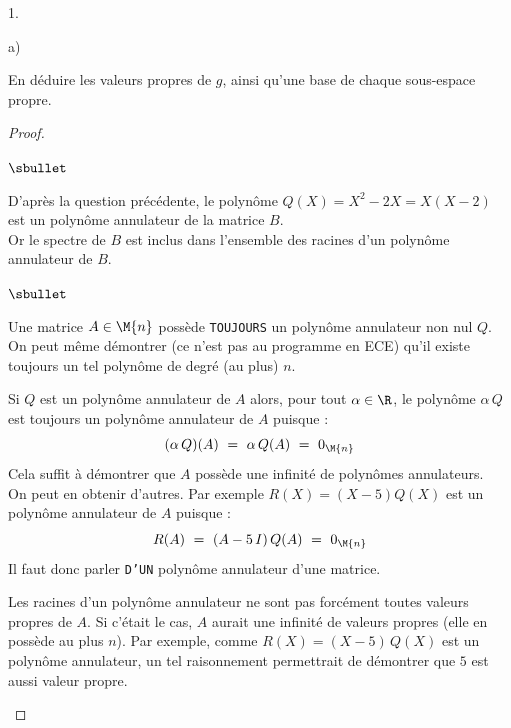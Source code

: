 \documentclass[11pt]{article}%
\begin{document}
\begin{noliste}{1.}
\begin{noliste}{a)}
    
    \item En déduire les valeurs propres de $g$, ainsi qu'une base de 
    chaque sous-espace propre.
    
    \begin{proof}~
      \begin{noliste}{$\sbullet$}
      \item D'après la question précédente, le polynôme $Q(X) =
	X^2-2X = X(X-2)$ est un polynôme annulateur de la matrice $B$.\\
	Or le spectre de $B$ est inclus dans l'ensemble des racines
        d'un polynôme annulateur de $B$.  
	
	\begin{remark}
	  \begin{noliste}{$\sbullet$}
	    \item Une matrice $A\in \M{n}$ possède {\tt TOUJOURS} un 
	    polynôme annulateur non nul $Q$.\\
	    On peut même démontrer (ce n'est pas au programme en ECE)
	    qu'il existe toujours un tel polynôme de degré (au plus) 
	    $n$.
	    
	    \item Si $Q$ est un polynôme annulateur de $A$ alors, pour 
	    tout $\alpha \in \R$, le polynôme $\alpha \, Q$ est 
	    toujours un polynôme annulateur de $A$ puisque :
	    \[
	      (\alpha \, Q)(A) \ = \ \alpha \, Q(A) \ = \
	      0_{\M{n}}
	    \]
	    Cela suffit à démontrer que $A$ possède une infinité de 
	    polynômes annulateurs.\\
	    On peut en obtenir d'autres. Par exemple $R(X) = (X-5)Q(X)$
	    est un polynôme annulateur de $A$ puisque :
	    \[
	      R(A) \ = \ (A-5 \, I) \, Q(A) \ = \ 0_{\M{n}}
	    \]
	    Il faut donc parler {\tt D'UN} polynôme annulateur d'une 
	    matrice.
	    
	    \item Les racines d'un polynôme annulateur ne sont pas 
	    forcément toutes valeurs propres de $A$. Si c'était le cas,
	    $A$ aurait une infinité de valeurs propres (elle en 
	    possède au plus $n$). Par exemple, comme $R(X) =
	    (X-5) \, Q(X)$ est un polynôme annulateur, un tel 
	    raisonnement permettrait de démontrer que $5$ est aussi
	    valeur propre.
	  \end{noliste}
	\end{remark}
	

\end{noliste}
\end{proof}
\end{noliste}
\end{noliste}
\end{document}
